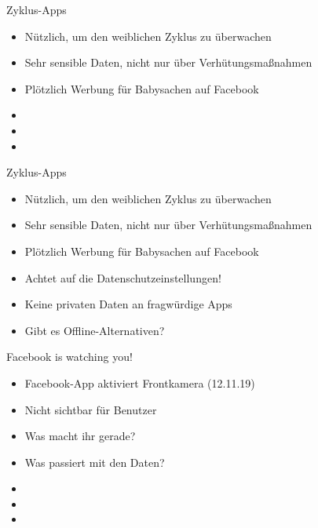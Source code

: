 \documentclass[10pt]{beamer}
\begin{document}
%
%
\begin{frame}[fragile]{Zyklus-Apps}
\begin{itemize}
    \item Nützlich, um den weiblichen Zyklus zu überwachen
    \item Sehr sensible Daten, nicht nur über Verhütungsmaßnahmen
    \item Plötzlich Werbung für Babysachen auf Facebook
    \item[]
    \item[]
    \item[]
\end{itemize}
\end{frame}

\begin{frame}[fragile]{Zyklus-Apps}
\begin{itemize}
    \item Nützlich, um den weiblichen Zyklus zu überwachen
    \item Sehr sensible Daten, nicht nur über Verhütungsmaßnahmen
    \item Plötzlich Werbung für Babysachen auf Facebook
    \item \alert{Achtet auf die Datenschutzeinstellungen!}
    \item \alert{Keine privaten Daten an fragwürdige Apps}
    \item Gibt es Offline-Alternativen?
\end{itemize}
\end{frame}

%
%
\begin{frame}[fragile]{Facebook is watching you!}
\begin{itemize}
    \item Facebook-App aktiviert Frontkamera (12.11.19)
    \item Nicht sichtbar für Benutzer
    \item Was macht ihr gerade?
    \item Was passiert mit den Daten?
    \item[]
    \item[]
    \item[]
  \end{itemize}
\end{frame}
\end{document}
